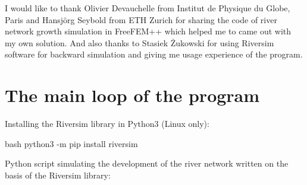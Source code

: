 \documentclass[]{pracamgr}
\begin{document}
      I would like to thank Olivier Devauchelle from Institut de Physique du Globe, Paris and Hansjörg Seybold from ETH Zurich for sharing the code of river network growth simulation in FreeFEM++ which helped me to came out with my own solution. And also thanks to Stasiek Żukowski for using Riversim software for backward simulation and giving me usage experience of the program.

    

  \appendix

  \chapter{The main loop of the program}
    
    Installing the Riversim library in Python3 (Linux only):
    
    \begin{mintedbox}{bash} 
      python3 -m pip install riversim\end{mintedbox}
    
    Python script simulating the development of the river network written on the basis of the Riversim library:
\end{document}
